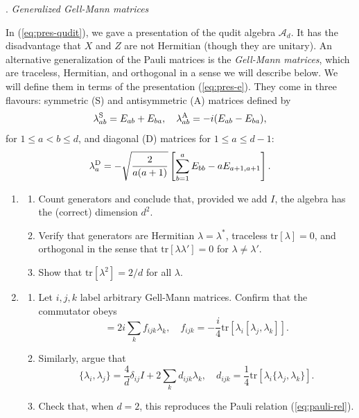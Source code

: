 \vspace{5pt}
\begin{Large}
. \emph{Generalized Gell-Mann matrices} 
\end{Large}
\vspace{5pt}

\noindent In (\ref{eq:pres-qudit}), we gave a presentation of the qudit
algebra $\mathcal{A}_d$. It has the disadvantage that $X$ and $Z$ are not Hermitian
(though they are unitary). An alternative generalization of the Pauli
matrices is the \emph{Gell-Mann matrices}, which are traceless,
Hermitian, and orthogonal in a sense we will describe below.
We will define them in terms of the presentation (\ref{eq:pres-e}).
They come in three flavours: symmetric (S) and antisymmetric (A) matrices defined by
\begin{equation}
  \notag
  \lambda^\text{S}_{ab} = E_{ab} + E_{ba}, \quad \lambda^\text{A}_{ab} = -i(E_{ab} - E_{ba}),
\end{equation}
for $1 \leq a < b \leq d$, and diagonal (D) matrices for $1
\leq a \leq d - 1$:
\begin{equation}
  \notag
  \lambda^\text{D}_{a} = -\sqrt{\frac{2}{a(a+1)}}\left[\sum_{b=1}^a
    E_{bb} - a E_{a+1,a+1}\right].
\end{equation}
\begin{enumerate}[label=(\alph*), itemsep=-1pt]
\item
\begin{enumerate}[label=\roman*., itemsep=-1pt]
  \item Count generators and conclude that, provided we add $I$, the algebra has
  the (correct) dimension $d^2$.

\item Verify that generators are Hermitian $\lambda = \lambda^*$,
  traceless $\mbox{tr}[\lambda]=0$, and orthogonal in the sense that
  $\mbox{tr}[\lambda\lambda'] = 0$ for $\lambda \neq \lambda'$.
\item Show that $\mbox{tr}[\lambda^2] = 2/d$ for all $\lambda$.
    \end{enumerate} 
\item 
\begin{enumerate}[label=\roman*., itemsep=-1pt]
  \item Let $i, j, k$ label arbitrary Gell-Mann matrices. Confirm
    that the commutator obeys
    \begin{equation}
      [\lambda_i, \lambda_j] = 2i \sum_k f_{ijk}\lambda_k, \quad
      f_{ijk} = -\frac{i}{4}\mbox{tr}[\lambda_i[\lambda_j,
      \lambda_k]].\tag{A.1}
    \end{equation}
  \item Similarly, argue that
    \begin{equation}
      \{\lambda_i, \lambda_j\} = \frac{4}{d} \delta_{ij}I + 2\sum_k d_{ijk}\lambda_k, \quad
      d_{ijk} = \frac{1}{4}\mbox{tr}[\lambda_i\{\lambda_j,
      \lambda_k\}].\tag{A.2}
    \end{equation}
        \item Check that, when $d=2$, this reproduces the Pauli
          relation (\ref{eq:pauli-rel}).
  \end{enumerate}
\end{enumerate}

